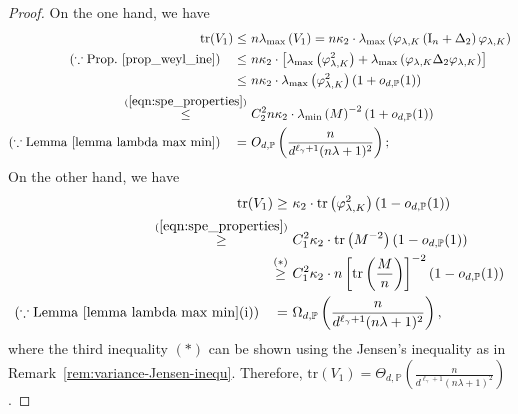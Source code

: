 \documentclass{article}
\theoremstyle{plain}
\theoremstyle{definition}
\theoremstyle{remark}
\begin{document}
\begin{appendix}
\begin{proof}
On the one hand, we have
\begin{equation*}
    \begin{aligned}
        \mathrm{tr}(V_1) \leq &~ n\lambda_{\text{max}}\left( V_{1} \right) = n\kappa_{2} \cdot \lambda_{\text{max}}\left( \varphi_{\lambda, K} \left( \mathrm{I}_{n} + \Delta_{2} \right)  \varphi_{\lambda, K}\right)  \\
        (\because \text{Prop.~\ref{prop_weyl_ine}})\quad \leq  &~n\kappa_{2} \cdot \left[ \lambda_{\text{max}}\left( \varphi_{\lambda, K}^2\right) + \lambda_{\text{max}}\left( \varphi_{\lambda, K} \Delta_{2} \varphi_{\lambda, K}\right)  \right]  \\
        \leq  &~ n\kappa_{2} \cdot \lambda_{\text{max}}\left( \varphi_{\lambda, K}^2\right) \left( 1 + o_{d, \mathbb{P}}(1) \right)\\
        \overset{(\ref{eqn:spe_properties})}{\leq}  &~ C_2^2 n\kappa_{2} \cdot \lambda_{\text{min}}\left( M\right)^{-2} \left( 1 + o_{d, \mathbb{P}}(1) \right)\\
        (\because \text{Lemma~\ref{lemma lambda max min}}) \quad =&~
        O_{d, \mathbb{P}}\left(\frac{n}{d^{\ell_{\gamma}+1}(n\lambda+1)^2}\right);
    \end{aligned}
\end{equation*}
On the other hand, we have
\begin{equation*}
    \begin{aligned}
        \mathrm{tr}(V_1) \geq &~  \kappa_{2} \cdot \mathrm{tr}\left( \varphi_{\lambda, K}^2\right) \left( 1 - o_{d, \mathbb{P}}(1) \right)\\
        \overset{(\ref{eqn:spe_properties})}{\geq}&~
        C_1^2\kappa_{2} \cdot \mathrm{tr}\left( M^{-2}\right) \left( 1 - o_{d, \mathbb{P}}(1) \right)\\
       \overset{(\ast)}{ \geq} &~  C_1^2 \kappa_{2} \cdot n \left[ \mathrm{tr}\left( \frac{M}{n} \right) \right]^{-2} \left( 1 -o_{d, \mathbb{P}}(1) \right)\\
                (\because \text{Lemma~\ref{lemma lambda max min}(i)})\quad =&~
        \Omega_{d, \mathbb{P}}\left(\frac{n}{d^{\ell_{\gamma}+1}(n\lambda+1)^2}\right),
    \end{aligned}
\end{equation*}
where the third inequality $(\ast)$ can be shown using the Jensen's inequality as in Remark~\ref{rem:variance-Jensen-inequ}. 
Therefore, $\mathrm{tr}(V_1) = \Theta_{d, \mathbb{P}}\left(\frac{n}{d^{\ell_{\gamma}+1}(n\lambda+1)^2}\right)$.


\end{proof}
\end{appendix}
\end{document}
